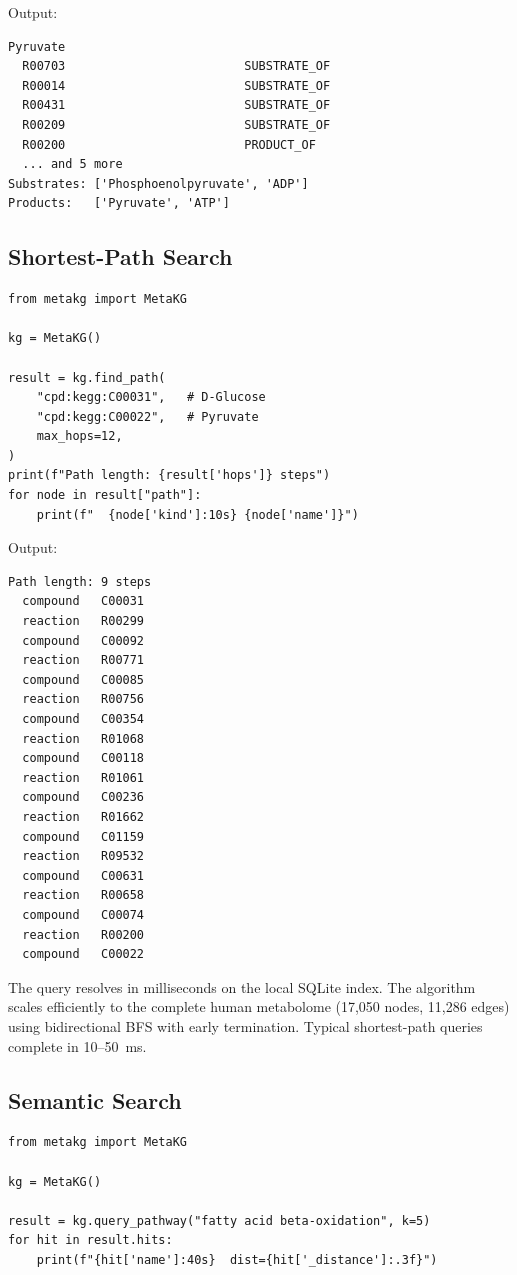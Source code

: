 \documentclass[10pt]{article}
\begin{document}
Output:
\begin{lstlisting}[style=bash, caption={}]
Pyruvate
  R00703                         SUBSTRATE_OF
  R00014                         SUBSTRATE_OF
  R00431                         SUBSTRATE_OF
  R00209                         SUBSTRATE_OF
  R00200                         PRODUCT_OF
  ... and 5 more
Substrates: ['Phosphoenolpyruvate', 'ADP']
Products:   ['Pyruvate', 'ATP']
\end{lstlisting}

\subsection{Shortest-Path Search}

\begin{lstlisting}[style=python, caption={Finding the shortest metabolic route between two compounds.}]
from metakg import MetaKG

kg = MetaKG()

result = kg.find_path(
    "cpd:kegg:C00031",   # D-Glucose
    "cpd:kegg:C00022",   # Pyruvate
    max_hops=12,
)
print(f"Path length: {result['hops']} steps")
for node in result["path"]:
    print(f"  {node['kind']:10s} {node['name']}")
\end{lstlisting}

Output:
\begin{lstlisting}[style=bash, caption={}]
Path length: 9 steps
  compound   C00031
  reaction   R00299
  compound   C00092
  reaction   R00771
  compound   C00085
  reaction   R00756
  compound   C00354
  reaction   R01068
  compound   C00118
  reaction   R01061
  compound   C00236
  reaction   R01662
  compound   C01159
  reaction   R09532
  compound   C00631
  reaction   R00658
  compound   C00074
  reaction   R00200
  compound   C00022
\end{lstlisting}

The query resolves in milliseconds on the local SQLite index. The algorithm
scales efficiently to the complete human metabolome (17,050 nodes, 11,286
edges) using bidirectional BFS with early termination. Typical shortest-path
queries complete in 10--50~ms.

\subsection{Semantic Search}

\begin{lstlisting}[style=python, caption={Semantic pathway retrieval.}]
from metakg import MetaKG

kg = MetaKG()

result = kg.query_pathway("fatty acid beta-oxidation", k=5)
for hit in result.hits:
    print(f"{hit['name']:40s}  dist={hit['_distance']:.3f}")
\end{lstlisting}
\end{document}
